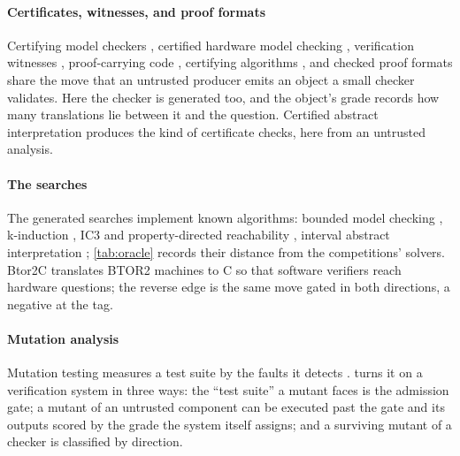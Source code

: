 \paragraph{Certificates, witnesses, and proof formats}
Certifying model checkers \citep{namjoshi2001certifying}, certified
hardware model checking \citep{yu2021certifaiger}, verification
witnesses \citep{beyer2015witnesses,beyer2022witnesses},
proof-carrying code \citep{necula1997pcc}, certifying algorithms
\citep{mcconnell2011certifying}, and checked proof formats
\citep{wetzler2014drat,tan2021cakelpr,andreotti2023carcara} share the
move that an untrusted producer emits an object a small checker
validates. Here the checker is generated too, and the object's grade
records how many translations lie between it and the question. Certified
abstract interpretation \citep{besson2006pcc,jourdan2015verasco}
produces the kind of certificate  checks, here from an
untrusted analysis.

\paragraph{The searches}
The generated searches implement known algorithms: bounded model
checking \citep{biere1999bmc}, k-induction
\citep{sheeran2000kinduction}, IC3 and property-directed reachability
\citep{bradley2011ic3,een2011pdr}, interval abstract interpretation
\citep{cousot1977abstract}; \cref{tab:oracle} records their distance
from the competitions' solvers. Btor2C
\citep{beyer2023btor2c} translates BTOR2 machines to C so that
software verifiers reach hardware questions; the reverse edge is the
same move gated in both directions, a negative at the tag.

\paragraph{Mutation analysis}
Mutation testing measures a test suite by the faults it detects
\citep{demillo1978hints,jia2011mutation}.  turns it
on a verification system in three ways: the ``test suite'' a mutant faces is the admission gate; a mutant of an untrusted component can be executed past the
gate and its outputs scored by the grade the system itself assigns;
and a surviving mutant of a checker is classified by direction.

